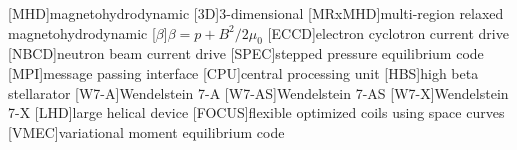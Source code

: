 \begin{acronym}
	
[MHD]{magnetohydrodynamic}
[3D]{3-dimensional}
[MRxMHD]{multi-region relaxed magnetohydrodynamic}
[$\beta$]{$\beta=p+B^2/2\mu_0$}
[ECCD]{electron cyclotron current drive}
[NBCD]{neutron beam current drive}
[SPEC]{stepped pressure equilibrium code}
[MPI]{message passing interface}
[CPU]{central processing unit}
[HBS]{high beta stellarator}
[W7-A]{Wendelstein 7-A}
[W7-AS]{Wendelstein 7-AS}
[W7-X]{Wendelstein 7-X}
[LHD]{large helical device}
[FOCUS]{flexible optimized coils using space curves}
[VMEC]{variational moment equilibrium code}

\end{acronym}